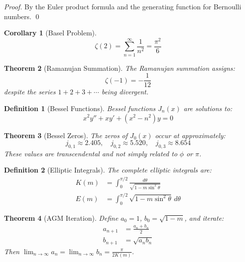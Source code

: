 \documentclass[aps,prd,preprint,superscriptaddress,showpacs,nofootinbib,longbibliography]{revtex4-2}
\newtheorem{theorem}{Theorem}
\newtheorem{corollary}[theorem]{Corollary}
\newtheorem{definition}{Definition}
\begin{document}
\begin{proof}
By the Euler product formula and the generating function for Bernoulli numbers. \qed
\end{proof}

\begin{corollary}[Basel Problem]
\label{cor:basel}
\begin{equation}
\zeta(2) = \sum_{n=1}^\infty \frac{1}{n^2} = \frac{\pi^2}{6}
\end{equation}
\end{corollary}

\begin{theorem}[Ramanujan Summation]
\label{thm:ramanujan}
The Ramanujan summation assigns:
\begin{equation}
\zeta(-1) = -\frac{1}{12}
\end{equation}
despite the series $1 + 2 + 3 + \cdots$ being divergent.
\end{theorem}

\begin{definition}[Bessel Functions]
\label{def:bessel}
Bessel functions $J_n(x)$ are solutions to:
\begin{equation}
x^2 y'' + x y' + (x^2 - n^2) y = 0
\end{equation}
\end{definition}

\begin{theorem}[Bessel Zeros]
\label{thm:bessel_zeros}
The zeros of $J_0(x)$ occur at approximately:
\begin{equation}
j_{0,1} \approx 2.405,\quad j_{0,2} \approx 5.520,\quad j_{0,3} \approx 8.654
\end{equation}
These values are transcendental and not simply related to $\phi$ or $\pi$.
\end{theorem}

\begin{definition}[Elliptic Integrals]
\label{def:elliptic}
The complete elliptic integrals are:
\begin{align}
K(m) &= \int_0^{\pi/2} \frac{d\theta}{\sqrt{1 - m \sin^2 \theta}} \\
E(m) &= \int_0^{\pi/2} \sqrt{1 - m \sin^2 \theta} \, d\theta
\end{align}
\end{definition}

\begin{theorem}[AGM Iteration]
\label{thm:agm}
Define $a_0 = 1$, $b_0 = \sqrt{1-m}$, and iterate:
\begin{align}
a_{n+1} &= \frac{a_n + b_n}{2} \\
b_{n+1} &= \sqrt{a_n b_n}
\end{align}
Then $\lim_{n \to \infty} a_n = \lim_{n \to \infty} b_n = \frac{\pi}{2 K(m)}$.
\end{theorem}
\end{document}

